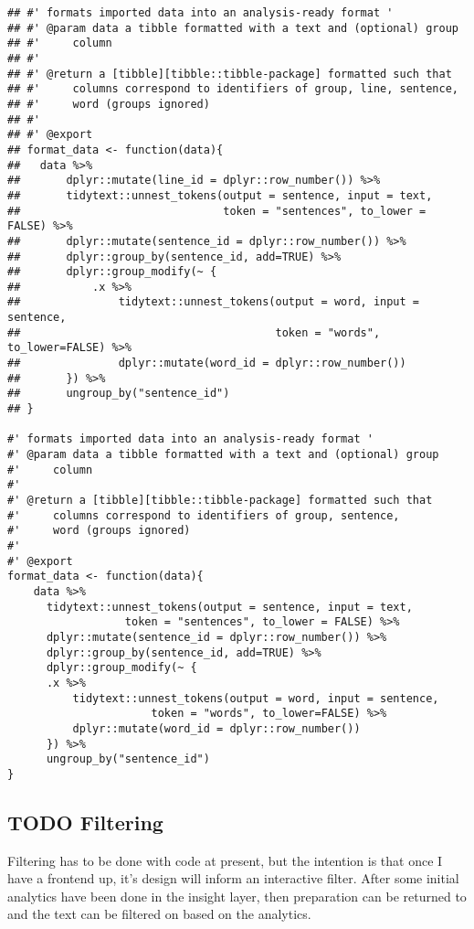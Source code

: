 \documentclass[a4paper, 11pt]{article}
\begin{document}
\begin{verbatim}
## #' formats imported data into an analysis-ready format '
## #' @param data a tibble formatted with a text and (optional) group
## #'     column
## #'
## #' @return a [tibble][tibble::tibble-package] formatted such that
## #'     columns correspond to identifiers of group, line, sentence,
## #'     word (groups ignored)
## #'
## #' @export
## format_data <- function(data){
##   data %>%
##       dplyr::mutate(line_id = dplyr::row_number()) %>% 
##       tidytext::unnest_tokens(output = sentence, input = text,
##                               token = "sentences", to_lower = FALSE) %>%
##       dplyr::mutate(sentence_id = dplyr::row_number()) %>%
##       dplyr::group_by(sentence_id, add=TRUE) %>%
##       dplyr::group_modify(~ {
##           .x %>%
##               tidytext::unnest_tokens(output = word, input = sentence,
##                                       token = "words", to_lower=FALSE) %>%
##               dplyr::mutate(word_id = dplyr::row_number())
##       }) %>%
##       ungroup_by("sentence_id")
## }

#' formats imported data into an analysis-ready format '
#' @param data a tibble formatted with a text and (optional) group
#'     column
#'
#' @return a [tibble][tibble::tibble-package] formatted such that
#'     columns correspond to identifiers of group, sentence,
#'     word (groups ignored)
#'
#' @export
format_data <- function(data){
    data %>%
      tidytext::unnest_tokens(output = sentence, input = text,
			      token = "sentences", to_lower = FALSE) %>%
      dplyr::mutate(sentence_id = dplyr::row_number()) %>%
      dplyr::group_by(sentence_id, add=TRUE) %>%
      dplyr::group_modify(~ {
	  .x %>%
	      tidytext::unnest_tokens(output = word, input = sentence,
				      token = "words", to_lower=FALSE) %>%
	      dplyr::mutate(word_id = dplyr::row_number())
      }) %>%
      ungroup_by("sentence_id")
}
\end{verbatim}
\subsection{{\bfseries\sffamily TODO} Filtering}
\label{sec:org1233475}
Filtering has to be done with code at present, but the intention is
that once I have a frontend up, it's design will inform an interactive
filter. After some initial analytics have been done in the insight
layer, then preparation can be returned to and the text can be
filtered on based on the analytics.
\end{document}
